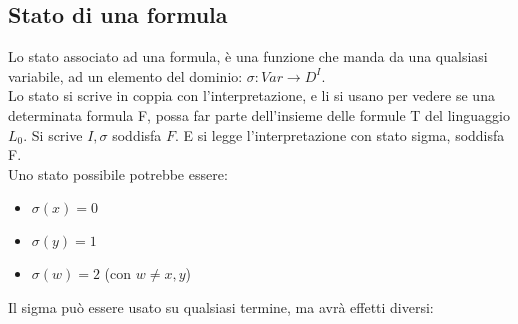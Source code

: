 \documentclass[11pt]{article}
\begin{document}
\subsection{Stato di una formula}
Lo stato associato ad una formula, è una funzione che manda da una qualsiasi variabile, ad un elemento
 del dominio: $\sigma : Var \to D^{I}$.\\
Lo stato si scrive in coppia con l'interpretazione, e li si usano per vedere se una determinata formula F, possa far parte dell'insieme 
delle formule T del linguaggio $L_{0}$. Si scrive $I, \sigma$ soddisfa $F$. E si legge l'interpretazione con stato sigma, soddisfa F.\\
Uno stato possibile potrebbe essere:
\begin{itemize}
    \item $\sigma(x) = 0$
    \item $\sigma(y) = 1$
    \item $\sigma(w) = 2$ (con $w \neq x,y$)
\end{itemize}
Il sigma può essere usato su qualsiasi termine, ma avrà effetti diversi:
\end{document}

